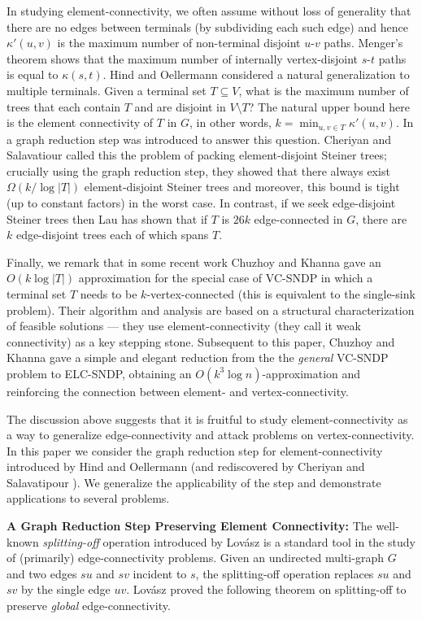 \documentclass[11pt]{article}
\newcommand{\vconn}{\kappa}
\newcommand{\elconn}{\kappa'}
\begin{document}
In studying element-connectivity, we often assume without loss of
generality that there are no edges between terminals (by subdividing
each such edge) and hence $\elconn(u,v)$ is the maximum number of
non-terminal disjoint $u$-$v$ paths. Menger's theorem shows that the
maximum number of internally vertex-disjoint $s$-$t$ paths is equal to
$\vconn(s,t)$.  Hind and Oellermann \cite{hind} considered a natural
generalization to multiple terminals. Given a terminal set $T
\subseteq V$, what is the maximum number of trees that each contain
$T$ and are disjoint in $V \setminus T$? The natural upper bound here
is the element connectivity of $T$ in $G$, in other words, $k =
\min_{u,v \in T} \elconn(u,v)$. In \cite{hind} a graph reduction step
was introduced to answer this question.  Cheriyan and Salavatiour
\cite{cs} called this the problem of packing element-disjoint Steiner
trees; crucially using the graph reduction step, they showed that
there always exist $\Omega(k/ \log |T|)$ element-disjoint Steiner
trees and moreover, this bound is tight (up to constant factors) in
the worst case. In contrast, if we seek edge-disjoint Steiner trees
then Lau \cite{Lau1} has shown that if $T$ is $26k$ edge-connected in
$G$, there are $k$ edge-disjoint trees each of which spans $T$.

Finally, we remark that in some recent work Chuzhoy and Khanna
\cite{ChuzhoyK08} gave an $O(k \log |T|)$ approximation for the
special case of VC-SNDP in which a terminal set $T$ needs to be
$k$-vertex-connected (this is equivalent to the single-sink problem).
Their algorithm and analysis are based on a structural
characterization of feasible solutions --- they use
element-connectivity (they call it weak connectivity) as a key
stepping stone. Subsequent to this paper, Chuzhoy and Khanna
\cite{CKsndp} gave a simple and elegant reduction from the the
\emph{general} VC-SNDP problem to ELC-SNDP, obtaining an $O(k^3 \log
n)$-approximation and reinforcing the connection between element- and
vertex-connectivity.

The discussion above suggests that it is fruitful to study
element-connectivity as a way to generalize edge-connectivity and
attack problems on vertex-connectivity.  In this paper we consider the
graph reduction step for element-connectivity introduced by Hind and
Oellermann \cite{hind} (and rediscovered by Cheriyan and Salavatipour
\cite{cs}). We generalize the applicability of the step and
demonstrate applications to several problems.

\smallskip
\noindent
{\bf A Graph Reduction Step Preserving Element Connectivity:}
The well-known {\em splitting-off} operation introduced by Lov\'{a}sz
\cite{Lovasz} is a standard tool in the study of (primarily)
edge-connectivity problems. Given an undirected multi-graph $G$ and
two edges $su$ and $sv$ incident to $s$, the splitting-off operation
replaces $su$ and $sv$ by the single edge $uv$.  Lov\'{a}sz proved the
following theorem on splitting-off to preserve {\em global}
edge-connectivity.
\end{document}
